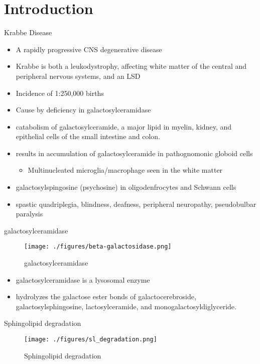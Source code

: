 \documentclass[presentation, smaller]{beamer}
\begin{document}
\section{Introduction}
\label{sec:orgf70e648}
\begin{frame}[label={sec:org9ef5dd4}]{Krabbe Disease}
\begin{itemize}
\item A rapidly progressive CNS degenerative disease
\item Krabbe is both a leukodystrophy, affecting white matter of the central
and peripheral nervous systems, and an LSD

\item Incidence of 1:250,000 births
\item Cause by deficiency in galactosylceramidase
\item catabolism of galactosylceramide, a major lipid in myelin, kidney, and epithelial cells of the small intestine and colon.
\item results in accumulation of galactosylceramide in pathognomonic globoid cells
\begin{itemize}
\item Multinucleated microglia/macrophage seen in the white matter
\end{itemize}
\item galactosylspingosine (psychosine) in oligodenfrocytes and Schwann cells
\item spastic quadriplegia, blindness, deafness, peripheral neuropathy, pseudobulbar paralysis
\end{itemize}
\end{frame}

\begin{frame}[label={sec:org3143542}]{galactosylceramidase}
\begin{figure}[htbp]
\centering
\texttt{[image: ./figures/beta-galactosidase.png]}
\caption{\label{fig:org80c11ae}
galactosylceramidase}
\end{figure}

\begin{itemize}
\item galactosylceramidase is a lysosomal enzyme
\item hydrolyzes the galactose ester bonds of galactocerebroside, galactosylsphingosine, lactosylceramide, and monogalactosyldiglyceride.
\end{itemize}
\end{frame}

\begin{frame}[label={sec:org27035a7}]{Sphingolipid degradation}
\begin{figure}[htbp]
\centering
\texttt{[image: ./figures/sl\_degradation.png]}
\caption[deg]{\label{fig:org18abd93}
Sphingolipid degradation}
\end{figure}
\end{frame}
\end{document}
